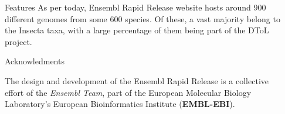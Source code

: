 \documentclass[final]{beamer}
\newlength{\sepwidth}
\newlength{\colwidth}
\newcommand{\separatorcolumn}{\begin{column}{\sepwidth}\end{column}}
\begin{document}
\begin{frame}[t]
\begin{columns}[t]
\begin{column}{\colwidth}
\begin{block}{Features}
As per today, Ensembl Rapid Release website hosts around 900 different genomes from some 600 species.
Of these, a vast majority belong to the Insecta taxa, with a large percentage of them being part of the DToL project. 

\end{block}

\begin{block}{Acknowledments}

The design and development of the Ensembl Rapid Release is a collective effort of the \textit{Ensembl Team}, part of the European Molecular Biology Laboratory's European Bioinformatics Institute (\textbf{EMBL-EBI}). 

\end{block}

\end{column}

\separatorcolumn

\end{columns}

\end{frame}

\newpage
\AtBeginShipout{%
\AtBeginShipoutDiscard
}


\end{document}
